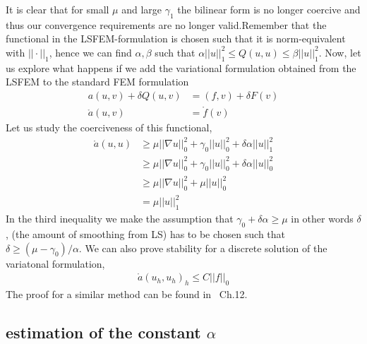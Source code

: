It is clear that for small $\mu$ and large $\gamma_1$ the bilinear form is no longer coercive and thus our convergence requirements are no longer valid.Remember that the functional in the LSFEM-formulation is chosen such that it is norm-equivalent with $|| \cdot ||_1 $, hence we can find $\alpha,\beta$ such that $\alpha||u||_1^2 \leq Q(u,u) \leq \beta||u||_1^2 $.
Now, let us explore what happens if we add the variational formulation obtained from the LSFEM to the standard FEM formulation
\begin{align}
	a(u,v) + \delta Q(u,v) &= (f,v) + \delta F(v) \\
	\mathring{a}(u,v) &= \mathring{f}(v)
	\label{eq:GLS}
\end{align}
Let us study the coerciveness of this functional,
\begin{align}
	\mathring{a}(u,u) &\geq \mu ||\nabla u||_0^2+\gamma_0||u||_0^2+\delta \alpha ||u||^2_1 \\
	&\geq \mu ||\nabla u||_0^2+\gamma_0||u||_0^2+\delta \alpha ||u||^2_0 \\
	&\geq \mu ||\nabla u||_0^2+\mu ||u||_0^2 \\
	&= \mu ||u||^2_1
	\label{eq:coercivity}
\end{align}
In the third inequality we make the assumption that $\gamma_0+\delta \alpha \geq \mu $ in other words $\delta$, (the amount of smoothing from LS) has to be chosen such that $\delta \geq (\mu-\gamma_0)/\alpha$.
We can also prove stability for a discrete solution of the variatonal formulation, 
\begin{align}
	\mathring{a}(u_h,u_h)_h \leq C ||f||_0
	\label{eq:stabilityResult}
\end{align}
The proof for a similar method can be found in~\cite{Quarteroni} Ch.12. 



\subsection{estimation of the constant $\alpha$}

